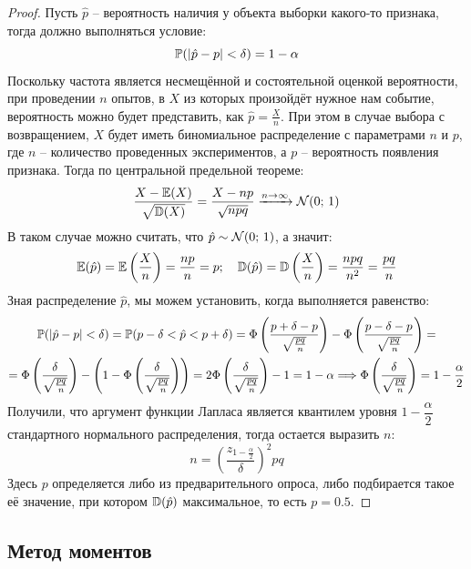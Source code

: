 \documentclass[12pt]{article}
\begin{document}
\begin{proof}
    Пусть $\hat{p}$ – вероятность наличия у объекта выборки какого-то признака, тогда должно выполняться условие:
    $$\mathbb{P}(|\hat{p}-p|<\delta)=1-\alpha$$
    Поскольку частота является несмещённой и состоятельной оценкой вероятности, при проведении $n$ опытов, в $X$ из которых произойдёт нужное нам событие, вероятность можно будет представить, как $\hat{p}=\frac{X}{n}$. При этом в случае выбора с возвращением, $X$ будет иметь биномиальное распределение с параметрами $n$ и $p$, где $n$ – количество проведенных экспериментов, а $p$ – вероятность появления признака. Тогда по центральной предельной теореме:
    $$\frac{X-\mathbb{E}(X)}{\sqrt{\mathbb{D}(X)}}=\frac{X-np}{\sqrt{npq}}\xrightarrow{n\to\infty}\mathcal{N}(0;\,1)$$
    В таком случае можно считать, что $\hat{p}\sim\mathcal{N}(0;\,1)$, а значит:
    $$\mathbb{E}(\hat{p})=\mathbb{E}\left(\frac{X}{n}\right)=\frac{np}{n}=p;\quad\mathbb{D}(\hat{p})=\mathbb{D}\left(\frac{X}{n}\right)=\frac{npq}{n^2}=\frac{pq}{n}$$
    Зная распределение $\hat{p}$, мы можем установить, когда выполняется равенство:
    \begin{multline*}
        \mathbb{P}(|\hat{p}-p|<\delta)=\mathbb{P}(p-\delta<\hat{p}<p+\delta)=\Phi\left(\frac{p+\delta-p}{\sqrt{\frac{pq}{n}}}\right) - \Phi\left(\frac{p-\delta-p}{\sqrt{\frac{pq}{n}}}\right)=\\
        =\Phi\left(\frac{\delta}{\sqrt{\frac{pq}{n}}}\right) - \left(1 - \Phi\left(\frac{\delta}{\sqrt{\frac{pq}{n}}}\right)\right)=2\Phi\left(\frac{\delta}{\sqrt{\frac{pq}{n}}}\right)-1=1-\alpha\Longrightarrow \Phi\left(\frac{\delta}{\sqrt{\frac{pq}{n}}}\right) = 1-\frac{\alpha}{2}
    \end{multline*}
    Получили, что аргумент функции Лапласа является квантилем уровня $1-\dfrac{\alpha}{2}$ стандартного нормального распределения, тогда остается выразить $n$:
    $$n=\left(\frac{z_{1-\frac{\alpha}{2}}}{\delta}\right)^2pq$$
    Здесь $p$ определяется либо из предварительного опроса, либо подбирается такое её значение, при котором $\mathbb{D}(\hat{p})$ максимальное, то есть $p=\num{0.5}$.
\end{proof}

\subsection{Метод моментов}
\end{document}
